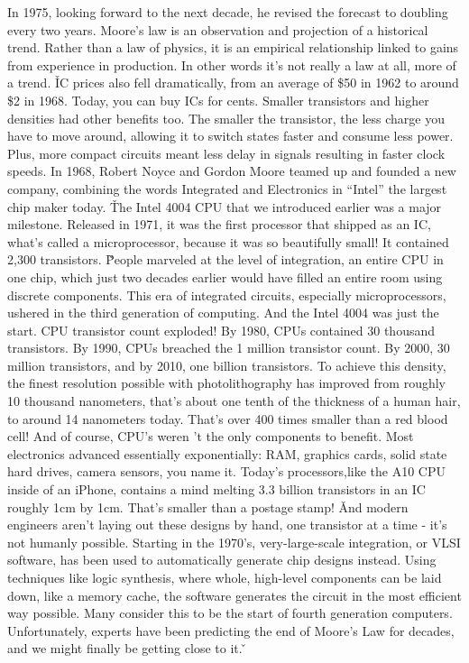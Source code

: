 In 1975, looking forward to the next decade, he revised the forecast to doubling every two years. Moore's law is an
observation and projection of a historical trend. Rather than a law of physics, it is an empirical relationship
linked to gains from experience in production. In other words it's not really a law at all, more of a trend. \v

IC prices also fell dramatically, from an average of \$50 in 1962 to around \$2 in 1968. Today, you can buy ICs for
cents. Smaller transistors and higher densities had other benefits too. The smaller the transistor, the less charge
you have to move around, allowing it to switch states faster and consume less power. Plus, more compact circuits
meant less delay in signals resulting in faster clock speeds. In 1968, Robert Noyce and Gordon Moore teamed up and
founded a new company, combining the words Integrated and Electronics in ``Intel'' the largest chip maker today. \v

The Intel 4004 CPU that we introduced earlier was a major milestone. Released in 1971, it was the first processor
that shipped as an IC, what's called a microprocessor, because it was so beautifully small! It contained 2,300
transistors. \v

People marveled at the level of integration, an entire CPU in one chip, which just two decades earlier would have
filled an entire room using discrete components. This era of integrated circuits, especially microprocessors, ushered
in the third generation of computing. And the Intel 4004 was just the start. CPU transistor count exploded! By 1980,
CPUs contained 30 thousand transistors. By 1990, CPUs breached the 1 million transistor count. By 2000, 30 million
transistors, and by 2010, one billion transistors. To achieve this density, the finest resolution possible with
photolithography has improved from roughly 10 thousand nanometers, that's about one tenth of the thickness of a human
hair, to around 14 nanometers today. That's over 400 times smaller than a red blood cell! And of course, CPU's weren
't the only components to benefit. Most electronics advanced essentially exponentially: RAM, graphics cards, solid
state hard drives, camera sensors, you name it. Today's processors,like the A10 CPU inside of an iPhone, contains a
mind melting 3.3 billion transistors in an IC roughly 1cm by 1cm. That's smaller than a postage stamp! \v

And modern engineers aren't laying out these designs by hand, one transistor at a time - it's not humanly possible.
Starting in the 1970's, very-large-scale integration, or VLSI software, has been used to automatically generate chip
designs instead. Using techniques like logic synthesis, where whole, high-level components can be laid down, like a
memory cache, the software generates the circuit in the most efficient way possible. Many consider this to be the
start of fourth generation computers. Unfortunately, experts have been predicting the end of Moore's Law for decades,
and we might finally be getting close to it. \v


